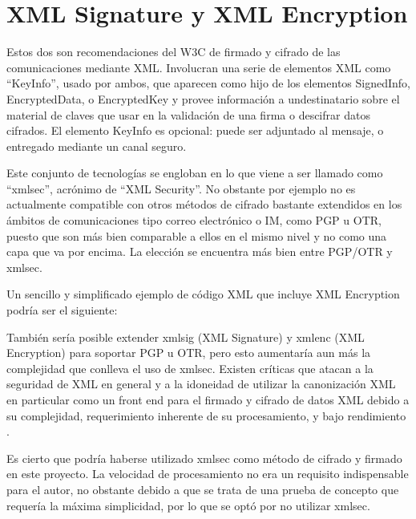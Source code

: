 \section{XML Signature y XML Encryption}\label{xmlsignature}

Estos dos son recomendaciones del W3C de firmado y cifrado de las comunicaciones mediante XML. Involucran una serie de elementos XML como ``KeyInfo'', usado por ambos, que aparecen como hijo de los elementos SignedInfo, EncryptedData, o EncryptedKey y provee información a undestinatario sobre el material de claves que usar en la validación de una firma o descifrar datos cifrados. El elemento KeyInfo es opcional: puede ser adjuntado al mensaje, o entregado mediante un canal seguro.

Este conjunto de tecnologías se engloban en lo que viene a ser llamado como ``xmlsec'', acrónimo de ``XML Security''. No obstante por ejemplo no es actualmente compatible con otros métodos de cifrado bastante extendidos en los ámbitos de comunicaciones tipo correo electrónico o IM, como PGP u OTR, puesto que son más bien comparable a ellos en el mismo nivel y no como una capa que va por encima. La elección se encuentra más bien entre PGP/OTR y xmlsec.

Un sencillo y simplificado ejemplo de código XML que incluye XML Encryption podría ser el siguiente:


También sería posible extender xmlsig (XML Signature) y xmlenc (XML Encryption) para soportar PGP u OTR, pero esto aumentaría aun más la complejidad que conlleva el uso de xmlsec. Existen críticas que atacan a la seguridad de XML en general y a la idoneidad de utilizar la canonización XML en particular como un front end para el firmado y cifrado de datos XML debido a su complejidad, requerimiento inherente de su procesamiento, y bajo rendimiento \cite{critica_xmlsec}.

Es cierto que podría haberse utilizado xmlsec como método de cifrado y firmado en este proyecto. La velocidad de procesamiento no era un requisito indispensable para el autor, no obstante debido a que se trata de una prueba de concepto que requería la máxima simplicidad, por lo que se optó por no utilizar xmlsec.

